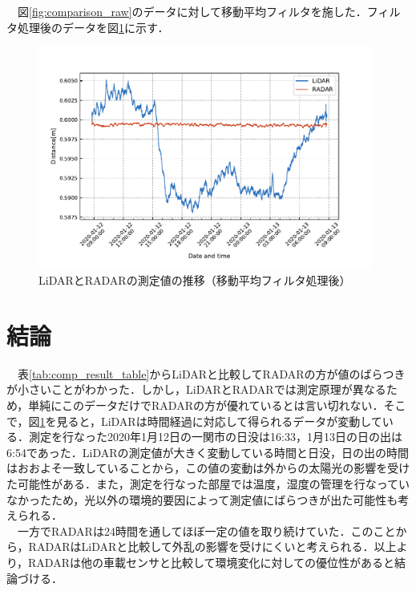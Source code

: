 　図\ref{fig:comparison_raw}のデータに対して移動平均フィルタを施した．フィルタ処理後のデータを図\ref{fig:comparison_filtered60}に示す．
\begin{figure}[H]
    \centering
    \includegraphics[width=11cm]{./fig/comparison_filtered60.pdf}
    \caption{LiDARとRADARの測定値の推移（移動平均フィルタ処理後）}
    \label{fig:comparison_filtered60}
\end{figure}

\section{結論}
　表\ref{tab:comp_result_table}からLiDARと比較してRADARの方が値のばらつきが小さいことがわかった．しかし，LiDARとRADARでは測定原理が異なるため，単純にこのデータだけでRADARの方が優れているとは言い切れない．そこで，図\ref{fig:comparison_filtered60}を見ると，LiDARは時間経過に対応して得られるデータが変動している．測定を行なった2020年1月12日の一関市の日没は16:33，1月13日の日の出は6:54であった．LiDARの測定値が大きく変動している時間と日没，日の出の時間はおおよそ一致していることから，この値の変動は外からの太陽光の影響を受けた可能性がある．また，測定を行なった部屋では温度，湿度の管理を行なっていなかったため，光以外の環境的要因によって測定値にばらつきが出た可能性も考えられる．\\
　一方でRADARは24時間を通してほぼ一定の値を取り続けていた．このことから，RADARはLiDARと比較して外乱の影響を受けにくいと考えられる．以上より，RADARは他の車載センサと比較して環境変化に対しての優位性があると結論づける．
